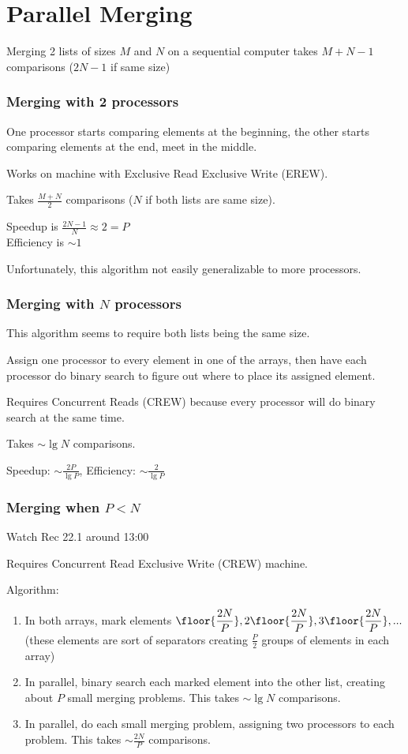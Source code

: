 \section{Parallel Merging}

Merging 2 lists of sizes $M$ and $N$ on a sequential computer takes $M + N - 1$ comparisons ($2N - 1$ if same size)

\subsubsection*{Merging with 2 processors}

One processor starts comparing elements at the beginning, the other starts comparing elements at the end, meet in the middle.

Works on machine with Exclusive Read Exclusive Write (EREW).

Takes $\frac{M + N}{2}$ comparisons ($N$ if both lists are same size).

Speedup is $\displaystyle \frac{2N - 1}{N} \approx 2 = P$\\
Efficiency is $\sim 1$

Unfortunately, this algorithm not easily generalizable to more processors.

\subsubsection*{Merging with $N$ processors}

This algorithm seems to require both lists being the same size.

Assign one processor to every element in one of the arrays, then have each processor do binary search to figure out where to place its assigned element.

Requires Concurrent Reads (CREW) because every processor will do binary search at the same time.

Takes $\sim \lg N$ comparisons.

Speedup: $\displaystyle \sim \frac{2P}{\lg P}$, Efficiency: $\displaystyle \sim \frac{2}{\lg P}$

\subsubsection*{Merging when $P < N$}

Watch Rec 22.1 around 13:00

Requires Concurrent Read Exclusive Write (CREW) machine.

Algorithm:
\begin{enumerate}
    \item In both arrays, mark elements $\displaystyle \floor{\frac{2N}{P}}, 2\floor{\frac{2N}{P}}, 3\floor{\frac{2N}{P}}, ...$ (these elements are sort of separators creating $\frac P 2$ groups of elements in each array)
    \item In parallel, binary search each marked element into the other list, creating about $P$ small merging problems. This takes $\sim \lg N$ comparisons.
    \item In parallel, do each small merging problem, assigning two processors to each problem. This takes $\sim \frac{2N}{P}$ comparisons.
\end{enumerate}

